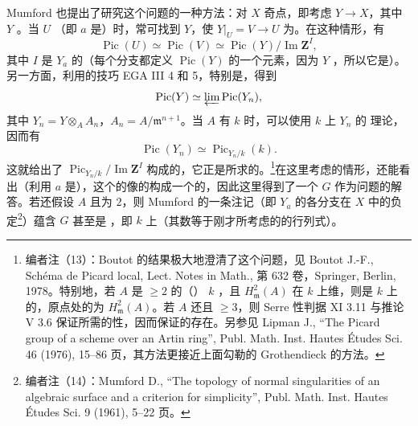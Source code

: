 Mumford 也提出了研究这个问题的一种方法：对 $X$ 奇点，即考虑 $Y\to X$，其中 $Y$ 。当 $U$ （即 $a$ 是）时，常可找到 $Y$，使 $Y|_U=V\to U$ 为。在这种情形，有
\[
\operatorname{Pic}(U)\simeq\operatorname{Pic}(V)
 \simeq\operatorname{Pic}(Y)/\operatorname{Im}\mathbf Z^I,
\]
其中 $I$ 是 $Y_a$ 的（每个分支都定义 $\operatorname{Pic}(Y)$ 的一个元素，因为 $Y$ ，所以它是）。另一方面，利用的技巧 EGA III 4 和 5，特别是，得到
\[
\operatorname{Pic}(Y)\simeq\varprojlim\operatorname{Pic}(Y_n),
\]
其中 $Y_n=Y\otimes_A A_n$，$A_n=A/\mathfrak m^{n+1}$。当 $A$ 有 $k$ 时，可以使用 $k$ 上 $Y_n$ 的 理论，因而有
\[
\operatorname{Pic}(Y_n)\simeq\operatorname{Pic}_{Y_n/k}(k).
\]
这就给出了 $\operatorname{Pic}_{Y_n/k}/\operatorname{Im}\mathbf Z^I$ 构成的，它正是所求的。\footnote{编者注（13）：Boutot 的结果极大地澄清了这个问题，见 Boutot J.-F., Schéma de Picard local, Lect. Notes in Math., 第 632 卷，Springer, Berlin, 1978。特别地，若 $A$ 是 $\geq2$ 的（） $k$ ，且 $H^2_{\mathfrak m}(A)$ 在 $k$ 上维，则是 $k$ 上的，原点处的为 $H^2_{\mathfrak m}(A)$。若 $A$ 还且 $\geq3$，则 Serre 性判据 XI 3.11 与推论 V 3.6 保证所需的性，因而保证的存在。另参见 Lipman J., “The Picard group of a scheme over an Artin ring”, Publ. Math. Inst. Hautes Études Sci. 46 (1976), 15--86 页，其方法更接近上面勾勒的 Grothendieck 的方法。}在这里考虑的情形，还能看出（利用 $a$ 是），这个的像的构成一个的，因此这里得到了一个 $G$ 作为问题的解答。若还假设 $A$ 且为 $2$，则 Mumford 的一条注记（即 $Y_a$ 的各分支在 $X$ 中的负定\footnote{编者注（14）：Mumford D., “The topology of normal singularities of an algebraic surface and a criterion for simplicity”, Publ. Math. Inst. Hautes Études Sci. 9 (1961), 5--22 页。}）蕴含 $G$ 甚至是
，即 $k$ 上（其数等于刚才所考虑的的行列式）。

